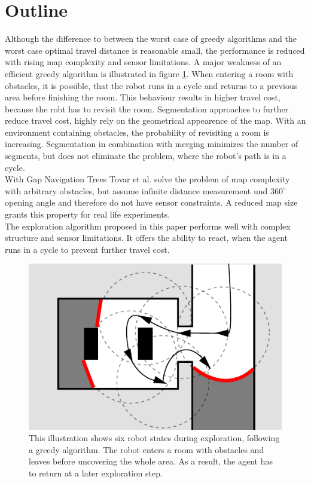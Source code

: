 \documentclass[twocolumn]{svjour3}[2016]
\begin{document}
\section{Outline}
\label{outline}
Although the difference to between the worst case of greedy algorithms and the worst case optimal travel distance is reasonable small, the performance is reduced with rising map complexity and sensor limitations.
A major weakness of an efficient greedy algorithm is illustrated in figure \ref{fig:1}. When entering a room with obstacles, it is possible, that the robot runs in a cycle and returns to a previous area before finishing the room. This behaviour results in higher travel cost, because the robt has to revisit the room. Segmentation approaches \cite{dirk_holz_evaluating_2010, kai_m._wurm_coordinated_2008} to further reduce travel cost, highly rely on the geometrical appearence of the map. With an environment containing obstacles, the probability of revisiting a room is increasing. Segmentation in combination with merging minimizes the number of segments, but does not eliminate the problem, where the robot's path is in a cycle.\\
With Gap Navigation Trees Tovar et al. \cite{benjamin_tovar_optimal_2003} solve the problem of map complexity with arbitrary obstacles, but assume infinite distance measurement und $360^{\circ}$ opening angle and therefore do not have sensor constraints. A reduced map size grants this property for real life experiments.\\
The exploration algorithm proposed in this paper performs well with complex structure and sensor limitations. It offers the ability to react, when the agent runs in a cycle to prevent further travel cost.

\begin{figure}
  \includegraphics{figures/fig1.pdf}
  \caption{
  This illustration shows six robot states during exploration, following a greedy algorithm. The robot enters a room with obstacles and leaves before uncovering the whole area. As a result, the agent has to return at a later exploration step.}
  \label{fig:1}       %
\end{figure}
\end{document}
